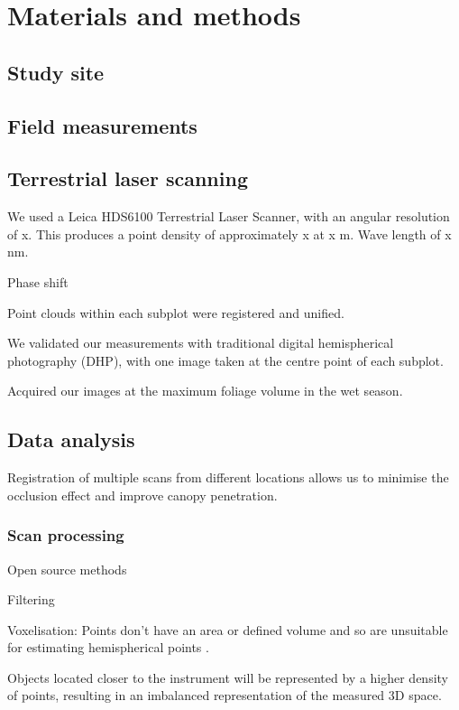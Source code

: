 \documentclass[11pt,a4paper]{article}
\begin{document}
\section{Materials and methods}

\subsection{Study site}

\subsection{Field measurements}

\subsection{Terrestrial laser scanning}

We used a Leica HDS6100 Terrestrial Laser Scanner, with an angular resolution of
x. This produces a point density of approximately x at x m. Wave length of x nm.

Phase shift

Point clouds within each subplot were registered and unified.

We validated our measurements with traditional digital hemispherical photography
(DHP), with one image taken at the centre point of each subplot.

Acquired our images at the maximum foliage volume in the wet season.

\subsection{Data analysis}

Registration of multiple scans from different locations allows us to minimise
the occlusion effect and improve canopy penetration.

\subsubsection{Scan processing}

Open source methods

Filtering

Voxelisation: Points don't have an area or defined volume and so are unsuitable
for estimating hemispherical points \citep{Seidel2012}.

Objects located closer to the instrument will be represented by a higher density
of points, resulting in an imbalanced representation of the measured 3D space.
\end{document}
